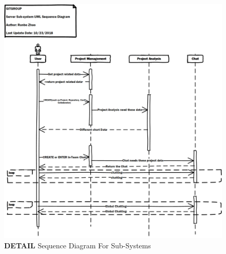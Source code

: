 \documentclass[12pt,a4paper]{report}
\begin{document}
\begin{figure}[h]
	\centering
	\includegraphics[width=\textwidth]{./pics/SubSysSequenceDiagram.png}
	\caption{\textbf{DETAIL} Sequence Diagram For Sub-Systems}
\end{figure}
\end{document}
